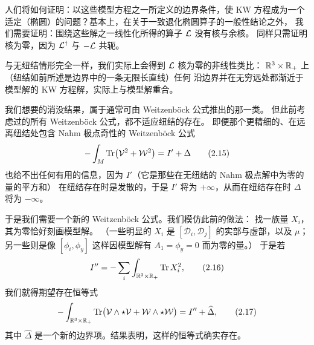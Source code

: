 人们将如何证明：以这些模型方程之一所定义的边界条件，使 KW 方程成为一个
适定（椭圆）的问题？基本上，在关于一致退化椭圆算子的一般性结论之外，
我们需要证明：围绕这些解之一线性化所得的算子 $\mathcal{L}$ 没有核与余核。
同样只需证明核为零，因为 $\mathcal{L}^{\dagger}$ 与 $-\mathcal{L}$ 共轭。


与无纽结情形完全一样，我们实际上会得到 $\mathcal{L}$ 核为零的非线性类比：
$\mathbb{R}^3\times\mathbb{R}_+$ 上（纽结如前所述是边界中的一条无限长直线）任何
沿边界并在无穷远处都渐近于模型解的 KW 方程解，实际上与模型解重合。


我们想要的消没结果，属于通常可由 Weitzenböck 公式推出的那一类。
但此前考虑过的所有 Weitzenböck 公式，都不适应纽结的存在。
即便那个更精细的、在远离纽结处包含 Nahm 极点奇性的 Weitzenböck 公式
\begin{equation}\stepcounter{equation}
  -\int_M\Tr\bigl(\sV^{2}+\sW^{2}\bigr)=I'+\Delta
  \tag{2.15}\label{eq:2.15}
\end{equation}
也给不出任何有用的信息，因为 $I'$（它是那些在无纽结的 Nahm 极点解中为零的量的平方和）
在纽结存在时是发散的，于是 $I'$ 将为 $+\infty$，从而在纽结存在时 $\Delta$ 将为 $-\infty$。


于是我们需要一个新的 Weitzenböck 公式。我们模仿此前的做法：
找一族量 $X_i$，其为零恰好刻画模型解。
（一些明显的 $X_i$ 是 $[\mathcal{D}_i,\mathcal{D}_j]$ 的实部与虚部，以及 $\mu$；
另一些则是像 $[\phi_i,\phi_y]$ 这样因模型解有 $A_1=\phi_y=0$ 而为零的量。）
于是若
\begin{equation}\stepcounter{equation}
  I''=-\sum_{i}\int_{\R^3\times\R_+}\Tr X_i^{2},
  \tag{2.16}\label{eq:2.16}
\end{equation}
我们就得期望存在恒等式
\begin{equation}\stepcounter{equation}
  -\int_{\R^3\times\R_+}\Tr\bigl(\sV\wedge\star\sV+\sW\wedge\star\sW\bigr)
  =I''+\widehat{\Delta},
  \tag{2.17}\label{eq:2.17}
\end{equation}
其中 $\widehat{\Delta}$ 是一个新的边界项。结果表明，这样的恒等式确实存在。

